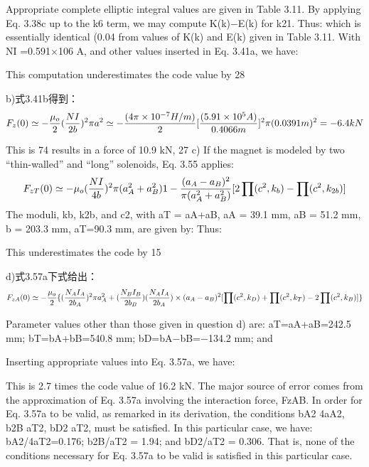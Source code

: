 Appropriate complete elliptic integral values are given in Table 3.11. By applying
Eq. 3.38c up to the k6 term, we may compute K(k)−E(k) for k21. Thus:
which is essentially identical (0.04%
from values of K(k) and E(k) given in Table 3.11.
With NI =0.591×106 A, and other values inserted in Eq. 3.41a, we have:

This computation underestimates the code value by 28%

b)式3.41b得到：
$$
F_{z}(0)\simeq-\frac{\mu_{o}}{2}(\frac{NI}{2b})^{2}\pi a^{2}\\%
\simeq-\frac{(4\pi\times10^{-7}H/m)}{2}[\frac{(5.91\times10^{5}A)}{0.4066m}]^{2}\pi(0.0391m)^{2}\\
=-6.4kN\\
$$

This is 74%
results in a force of 10.9 kN, 27%
c) If the magnet is modeled by two “thin-walled” and “long” solenoids, Eq. 3.55
applies:
$$
F_{zT}(0)\simeq-\mu_{o}(\frac{NI}{4b})^{2}\pi(a_{A}^{2}+a_{B}^{2}){1-\frac{(a_{A}-a_{B})^{2}}{\pi(a_{A}^{2}+a_{B}^{2})}[2\prod(c^{2},k_{b})-\prod(c^{2},k_{2b})]}\\%
$$
The moduli, kb, k2b, and c2, with aT = aA+aB, aA = 39.1 mm, aB = 51.2 mm, b =
203.3 mm, aT=90.3 mm, are given by:
Thus:

This underestimates the code by 15%


d)式3.57a下式给出：
$$
F_{zA}(0)\simeq-\frac{\mu_{o}}{2}\{(\frac{N_{A}I_{A}}{2b_{A}})^{2}\pi a_{A}^{2}+(\frac{N_{B}I_{B}}{2b_{B}})(\frac{N_{A}I_{A}}{2b_{A}})\times\\
(a_{A}-a_{B})^{2}[\prod(c^{2},k_{D})+\prod(c^{2},k_{T})-2\prod(c^{2},k_{B})]\}\\%
$$

Parameter values other than those given in question d) are: aT=aA+aB=242.5 mm;
bT=bA+bB=540.8 mm; bD=bA−bB=−134.2 mm; and

Inserting appropriate values into Eq. 3.57a, we have:

This is 2.7 times the code value of 16.2 kN. The major source of error comes from
the approximation of Eq. 3.57a involving the interaction force, FzAB. In order
for Eq. 3.57a to be valid, as remarked in its derivation, the conditions bA2   4aA2,
b2B  aT2, bD2 aT2, must be satisfied. In this particular case, we have: bA2/4aT2=0.176;
b2B/aT2 = 1.94; and bD2/aT2 = 0.306. That is, none of the conditions necessary for
Eq. 3.57a to be valid is satisfied in this particular case.

